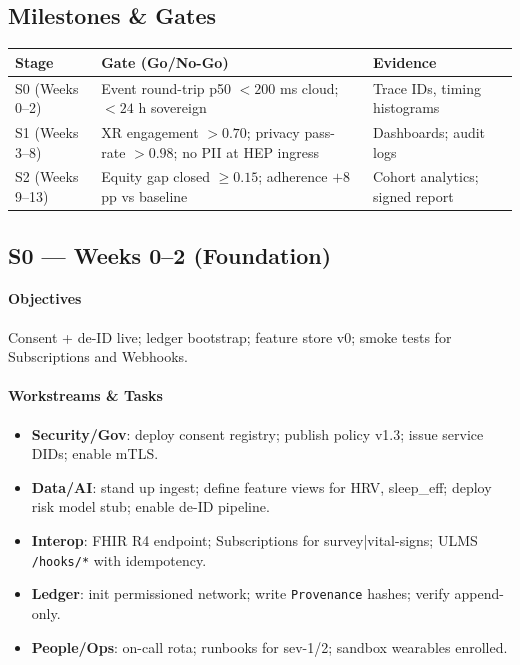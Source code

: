 \documentclass[11pt]{article}
\theoremstyle{plain}
\begin{document}
\subsection{Milestones \& Gates}
\begin{center}
\begin{tabular}{l l l}
\hline
Stage & Gate (Go/No-Go) & Evidence \\
\hline
S0 (Weeks 0–2) & Event round-trip p50 $<200$ ms cloud; $<24$ h sovereign & Trace IDs, timing histograms \\
S1 (Weeks 3–8) & XR engagement $>0.70$; privacy pass-rate $>0.98$; no PII at HEP ingress & Dashboards; audit logs \\
S2 (Weeks 9–13) & Equity gap closed $\ge 0.15$; adherence $+8$pp vs baseline & Cohort analytics; signed report \\
\hline
\end{tabular}
\end{center}

\subsection{S0 — Weeks 0–2 (Foundation)}
\paragraph{Objectives}
Consent + de-ID live; ledger bootstrap; feature store v0; smoke tests for Subscriptions and Webhooks.

\paragraph{Workstreams \& Tasks}
\begin{itemize}
  \item \textbf{Security/Gov}: deploy consent registry; publish policy v1.3; issue service DIDs; enable mTLS.
  \item \textbf{Data/AI}: stand up ingest; define feature views for HRV, sleep\_eff; deploy risk model stub; enable de-ID pipeline.
  \item \textbf{Interop}: FHIR R4 endpoint; Subscriptions for survey|vital-signs; ULMS \texttt{/hooks/*} with idempotency.
  \item \textbf{Ledger}: init permissioned network; write \texttt{Provenance} hashes; verify append-only.
  \item \textbf{People/Ops}: on-call rota; runbooks for sev-1/2; sandbox wearables enrolled.
\end{itemize}
\end{document}

